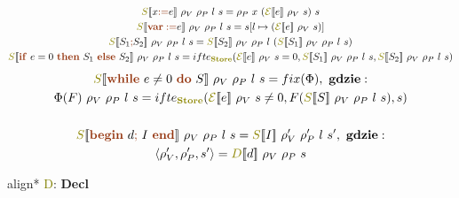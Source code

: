 \documentclass{article}
\newcommand{\syn}[1]{{\bf \textcolor{RawSienna}{#1}}}
\newcommand{\sem}[1]{{\bf \textcolor{olive}{#1}}}
\newcommand{\semcol}[1]{{\textcolor{olive}{#1}}}
\newcommand{\sembr}[1]{[\![#1]\!]}
\newcommand{\boxedeq}[1]{\begin{empheq}[box={\fboxsep=6pt\fbox}]{align*}#1\end{empheq}}
\newcommand{\bigeps}{\mathcal{E}}
\begin{document}
   \begin{gather*}
      \semcol{S}\sembr{x \syn{:=} e} \ \rho_V \ \rho_P \ l \ s =
      \rho_P \ x \ ( \semcol{\bigeps}\sembr{e} \ \rho_V \ s ) \ s \\
      \semcol{S}\sembr{\syn{var :=} e} \ \rho_V \ \rho_P \ l \ s =
      s [ l \mapsto ( \semcol{\bigeps}\sembr{e} \ \rho_V \ s )] \\
      \semcol{S}\sembr{S_{1} \syn{;} S_{2}} \ \rho_V \ \rho_P \ l \ s =
      \semcol{S}\sembr{S_{2}} \ \rho_V \ \rho_P \ l \ ( \semcol{S}\sembr{S_{1}} \ \rho_V \ \rho_P \ l \ s ) \\
      \semcol{S}\sembr{\syn{if} \ e = 0 \ \syn{then} \ S_{1} \ \syn{else} \ S_{2}} \ \rho_V \ \rho_P \ l \ s =
      ifte_{\sem{Store}}(
      \semcol{\bigeps}\sembr{e} \ \rho_V \ s = 0,
      \semcol{S}\sembr{S_{1}} \ \rho_V \ \rho_P \ l \ s,
      \semcol{S}\sembr{S_{2}} \ \rho_V \ \rho_P \ l \ s ) \\
   \end{gather*}
   \begin{gather*}
      \semcol{S}\sembr{\syn{while} \ e \ne 0 \ \syn{do} \ S} \ \rho_V \ \rho_P \ l \ s =
      fix(\Phi), \ {\bf gdzie}: \\
      \Phi(F) \ \rho_V \ \rho_P \ l \ s = ifte_{\sem{Store}}(
      \semcol{\bigeps}\sembr{e} \ \rho_V \ s \ne 0,
      F ( \semcol{S}\sembr{S} \ \rho_V \ \rho_P \ l \ s ),
      s ) \\
      \\
      \semcol{S}\sembr{\syn{begin} \ d \syn{;} \ I \ \syn{end}} \ \rho_V \ \rho_P \ l \ s =
      \semcol{S}\sembr{I} \ \rho_V' \ \rho_P' \ l \ s', \ {\bf gdzie}: \\
      \langle \rho_V', \rho_P', s' \rangle =
      \semcol{D}\sembr{d} \ \rho_V \ \rho_P \ s
   \end{gather*}


   \boxedeq{ \semcol{D}: \syn{Decl} \to \sem{DECL} }
\end{document}
